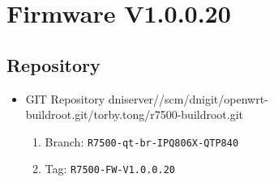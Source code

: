 \documentclass[12pt]{report}
\newcommand{\tlabel}[1]{
  \label{#1}%
  }
\begin{document}
\section{Firmware V1.0.0.20}

\tlabel{sec:1-0-1}
\subsection{Repository}
\begin{itemize}
	\item GIT Repository dniserver//scm/dnigit/openwrt-buildroot.git/torby.tong/r7500-buildroot.git
	\begin{enumerate}
		\item Branch: \texttt{R7500-qt-br-IPQ806X-QTP840}
                \item Tag: \texttt{R7500-FW-V1.0.0.20}
	\end{enumerate}
\end{itemize}
\end{document}
